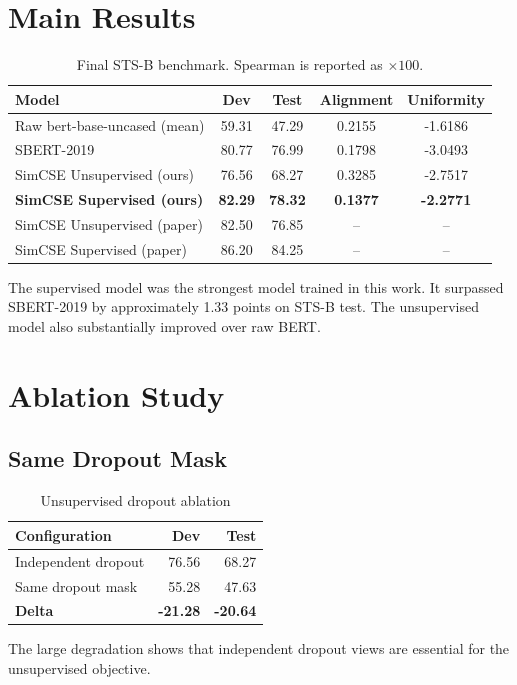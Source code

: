 \documentclass[10pt,conference]{IEEEtran}
\begin{document}
\section{Main Results}
\begin{table}[t]
\centering
\caption{Final STS-B benchmark. Spearman is reported as $\times100$.}
\begin{tabular}{lcccc}
\toprule
\textbf{Model} & \textbf{Dev} & \textbf{Test} & \textbf{Alignment} & \textbf{Uniformity} \\
\midrule
Raw bert-base-uncased (mean) & 59.31 & 47.29 & 0.2155 & -1.6186 \\
SBERT-2019 & 80.77 & 76.99 & 0.1798 & -3.0493 \\
SimCSE Unsupervised (ours) & 76.56 & 68.27 & 0.3285 & -2.7517 \\
\textbf{SimCSE Supervised (ours)} & \textbf{82.29} & \textbf{78.32} & \textbf{0.1377} & \textbf{-2.2771} \\
SimCSE Unsupervised (paper) & 82.50 & 76.85 & -- & -- \\
SimCSE Supervised (paper) & 86.20 & 84.25 & -- & -- \\
\bottomrule
\end{tabular}
\end{table}

The supervised model was the strongest model trained in this work. It surpassed SBERT-2019 by approximately 1.33 points on STS-B test. The unsupervised model also substantially improved over raw BERT.

\section{Ablation Study}
\subsection{Same Dropout Mask}
\begin{table}[H]
\centering
\caption{Unsupervised dropout ablation}
\begin{tabular}{lrr}
\toprule
Configuration & Dev & Test \\
\midrule
Independent dropout & 76.56 & 68.27 \\
Same dropout mask & 55.28 & 47.63 \\
\textbf{Delta} & \textbf{-21.28} & \textbf{-20.64} \\
\bottomrule
\end{tabular}
\end{table}
The large degradation shows that independent dropout views are essential for the unsupervised objective.
\end{document}
